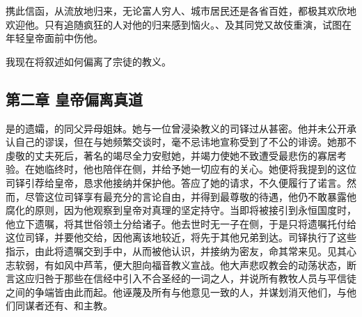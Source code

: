 \par

携此信函，从流放地归来，无论富人穷人、城市居民还是各省百姓，都极其欢欣地欢迎他。只有追随疯狂的人对他的归来感到恼火。、及其同党又故伎重演，试图在年轻皇帝面前中伤他。\par

我现在将叙述如何偏离了宗徒的教义。\par


\subsection{第二章 皇帝偏离真道}

是的遗孀，的同父异母姐妹。她与一位曾浸染教义的司铎过从甚密。他并未公开承认自己的谬误，但在与她频繁交谈时，毫不忌讳地宣称受到了不公的诽谤。她那不虔敬的丈夫死后，著名的竭尽全力安慰她，并竭力使她不致遭受最悲伤的寡居考验。在她临终时，他也陪伴在侧，并给予她一切应有的关心。她便将我提到的这位司铎引荐给皇帝，恳求他接纳并保护他。答应了她的请求，不久便履行了诺言。然而，尽管这位司铎享有最充分的言论自由，并得到最尊敬的待遇，他仍不敢暴露他腐化的原则，因为他观察到皇帝对真理的坚定持守。当即将被接引到永恒国度时，他立下遗嘱，将其世俗领土分给诸子。他去世时无一子在侧，于是只将遗嘱托付给这位司铎，并要他交给，因他离该地较近，将先于其他兄弟到达。司铎执行了这些指示，由此将遗嘱交到手中，从而被他认识，并接纳为密友，命其常来见。见其心志软弱，有如风中芦苇，便大胆向福音教义宣战。他大声悲叹教会的动荡状态，断言这应归咎于那些在信经中引入不合圣经的一词之人，并说所有教牧人员与平信徒之间的争端皆由此而起。他诬蔑及所有与他意见一致的人，并谋划消灭他们，与他们同谋者还有、和主教。\par

